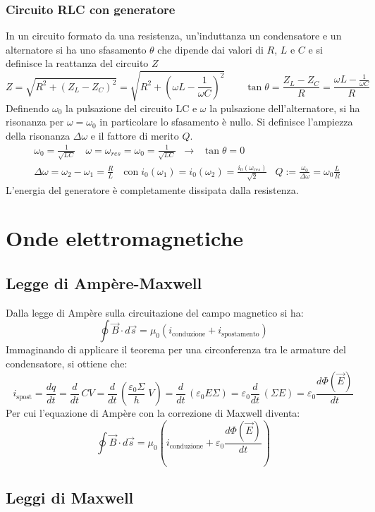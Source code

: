 \documentclass[a4paper]{article}
\newcommand\dt{\frac{d}{dt}\,}
\begin{document}
\subsubsection*{Circuito RLC con generatore}
In un circuito formato da una resistenza, un'induttanza un condensatore e un alternatore si ha uno sfasamento \(\theta\) che
dipende dai valori di \(R\), \(L\) e \(C\) e si definisce la reattanza del circuito \(Z\)
\[Z = \sqrt{R^2 + (Z_L-Z_C)^2} = \sqrt{R^2 + \left( \omega L - \frac{1}{\omega C} \right)^2} \qquad \tan \theta = \frac{Z_L - Z_C}{R} = \frac{\omega L - \frac{1}{\omega C}}{R}\]
Definendo \(\omega_0\) la pulsazione del circuito LC e \(\omega\) la pulsazione dell'alternatore, si ha risonanza per \(\omega = \omega_0\)
in particolare lo sfasamento è nullo. Si definisce l'ampiezza della risonanza \(\Delta \omega\) e il fattore di merito \(Q\).
\begin{align*}
	&\omega_0 = \frac{1}{\sqrt{LC}} \quad \omega = \omega_{res} = \omega_0 = \frac{1}{\sqrt{LC}} \;\; \rightarrow \;\; \tan \theta = 0 \\
	&\Delta \omega = \omega_2 - \omega_1 = \frac{R}{L} \quad \text{con} \; i_0(\omega_1) = i_0(\omega_2) = \frac{i_0(\omega_{res})}{\sqrt{2}}
	&Q := \frac{\omega_0}{\Delta \omega} = \omega_0 \frac{L}{R}
\end{align*}
L'energia del generatore è completamente dissipata dalla resistenza.

\newpage

\section{Onde elettromagnetiche}
\subsection{Legge di Ampère-Maxwell}
Dalla legge di Ampère sulla circuitazione del campo magnetico si ha:
\[\oint \vec{B} \cdot d\vec{s} = \mu_0(i_\text{conduzione} + i_\text{spostamento})\]
Immaginando di applicare il teorema per una circonferenza tra le armature del condensatore, si ottiene che:
\[i_\text{spost} = \frac{dq}{dt} = \dt CV = \dt \left(\frac{\varepsilon_0 \Sigma}{h} \; V\right) = \dt (\varepsilon_0 E \Sigma) = \varepsilon_0 \dt (\Sigma E) = \varepsilon_0 \frac{d \Phi(\vec{E})}{dt}\]
Per cui l'equazione di Ampère con la correzione di Maxwell diventa:
\[\oint \vec{B} \cdot d\vec{s} = \mu_0 \left( i_\text{conduzione} + \varepsilon_0 \frac{d \Phi(\vec{E})}{dt} \right)\]

\subsection{Leggi di Maxwell}
\end{document}

